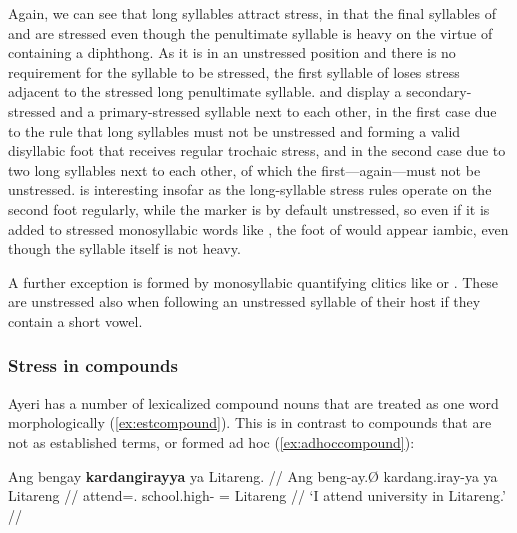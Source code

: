 Again, we can see that long syllables attract stress, in that the final 
syllables of  and  are 
stressed even though the penultimate syllable is heavy on the virtue of 
containing a diphthong. As it is in an unstressed position and there is no 
requirement for the syllable to be stressed, the first syllable of 
 loses stress adjacent to the stressed long 
penultimate syllable.  and  
display a secondary-stressed and a primary-stressed syllable next to each other, 
in the first case due to the rule that long syllables must not be unstressed 
and  forming a valid disyllabic foot that receives regular 
trochaic stress, and in the second case due to two long syllables next to each 
other, of which the first---again---must not be unstressed. 
 is interesting insofar as the long-syllable 
stress rules operate on the second foot regularly, while the marker 
 is by default unstressed, so even if it is added to 
stressed monosyllabic words like 
, the foot of  
would appear iambic, even though the syllable  itself is not 
heavy.

A further exception is formed by monosyllabic quantifying clitics like 
 or . These are 
unstressed also when following an unstressed syllable of their host if they 
contain a short vowel.


\subsubsection{Stress in compounds}

Ayeri has a number of lexicalized compound nouns that are treated 
as one word morphologically (\ref{ex:estcompound}). This is in contrast to 
compounds that are not as established terms, or formed ad hoc 
(\ref{ex:adhoccompound}):

\pex
\a\label{ex:estcompound}\begingl
	\gla Ang bengay \textbf{kardangirayya} ya Litareng. //
	\glb Ang beng-ay.Ø kardang.iray-ya ya Litareng //
	\glc \AgtT{} attend=\Fsg{}.\Top{} school.high-\Loc{} \Loc{}= Litareng //
	\glft `I attend university in Litareng.' //
\endgl

